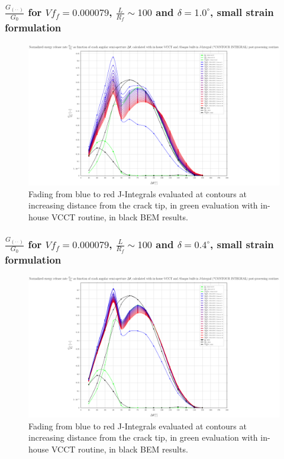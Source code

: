 \documentclass[first,firstsupp,lastsupp,handout,last,hyperref,table]{ETHclass}
\begin{document}
\begin{frame}
\frametitle{\small $\frac{G_{\left(\cdot\cdot\right)}}{G_{0}}$ for  $Vf_{f}=0.000079$, $\frac{L}{R_{f}}\sim100$ and $\delta=1.0^{\circ}$, small strain formulation}
\vspace{-0.5cm}
\centering
\captionsetup[figure]{font=scriptsize,labelfont=scriptsize}
\begin{figure}[!h]
\centering
\includegraphics[height=0.7\textheight]{2017-06-16_AbqRunSummary_SingleFiberEqRfSmallStrain-D1-0_VCCT-JINT_Summary.pdf}
  \caption{\scriptsize Fading from blue to red J-Integrals evaluated at contours at increasing distance from the crack tip, in green evaluation with in-house VCCT routine, in black BEM results.}
  \label{fig:res1}
\end{figure}
\end{frame}

\begin{frame}
\frametitle{\small $\frac{G_{\left(\cdot\cdot\right)}}{G_{0}}$ for  $Vf_{f}=0.000079$, $\frac{L}{R_{f}}\sim100$ and $\delta=0.4^{\circ}$, small strain formulation}
\vspace{-0.5cm}
\centering
\captionsetup[figure]{font=scriptsize,labelfont=scriptsize}
\begin{figure}[!h]
\centering
\includegraphics[height=0.7\textheight]{2017-06-16_AbqRunSummary_SingleFiberEqRfSmallStrain-D0-4_VCCT-JINT_Summary.pdf}
  \caption{\scriptsize Fading from blue to red J-Integrals evaluated at contours at increasing distance from the crack tip, in green evaluation with in-house VCCT routine, in black BEM results.}
  \label{fig:res1}
\end{figure}
\end{frame}
\end{document}
